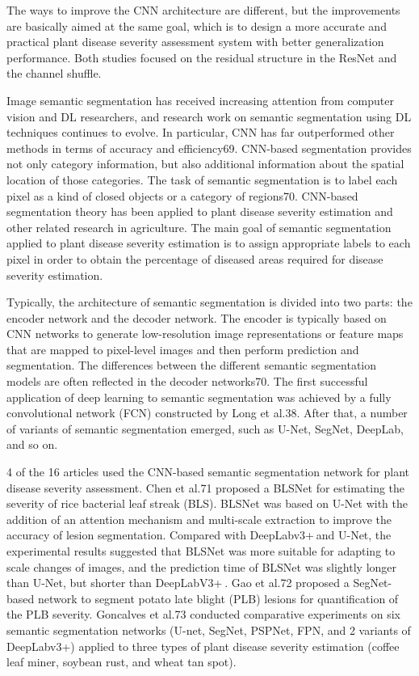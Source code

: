 
The ways to improve the CNN architecture are different, but the improvements are basically aimed at the same goal, which is to design a more accurate and practical plant disease severity assessment system with better generalization performance. Both studies focused on the residual structure in the ResNet and the channel shuffle.

Image semantic segmentation has received increasing attention from computer vision and DL researchers, and research work on semantic segmentation using DL techniques continues to evolve. In particular, CNN has far outperformed other methods in terms of accuracy and efficiency69. CNN-based segmentation provides not only category information, but also additional information about the spatial location of those categories. The task of semantic segmentation is to label each pixel as a kind of closed objects or a category of regions70. CNN-based segmentation theory has been applied to plant disease severity estimation and other related research in agriculture. The main goal of semantic segmentation applied to plant disease severity estimation is to assign appropriate labels to each pixel in order to obtain the percentage of diseased areas required for disease severity estimation.

Typically, the architecture of semantic segmentation is divided into two parts: the encoder network and the decoder network. The encoder is typically based on CNN networks to generate low-resolution image representations or feature maps that are mapped to pixel-level images and then perform prediction and segmentation. The differences between the different semantic segmentation models are often reflected in the decoder networks70. The first successful application of deep learning to semantic segmentation was achieved by a fully convolutional network (FCN) constructed by Long et al.38. After that, a number of variants of semantic segmentation emerged, such as U-Net, SegNet, DeepLab, and so on.

4 of the 16 articles used the CNN-based semantic segmentation network for plant disease severity assessment. Chen et al.71 proposed a BLSNet for estimating the severity of rice bacterial leaf streak (BLS). BLSNet was based on U-Net with the addition of an attention mechanism and multi-scale extraction to improve the accuracy of lesion segmentation. Compared with DeepLabv3+ and U-Net, the experimental results suggested that BLSNet was more suitable for adapting to scale changes of images, and the prediction time of BLSNet was slightly longer than U-Net, but shorter than DeepLabV3+ . Gao et al.72 proposed a SegNet-based network to segment potato late blight (PLB) lesions for quantification of the PLB severity. Goncalves et al.73 conducted comparative experiments on six semantic segmentation networks (U-net, SegNet, PSPNet, FPN, and 2 variants of DeepLabv3+) applied to three types of plant disease severity estimation (coffee leaf miner, soybean rust, and wheat tan spot).

